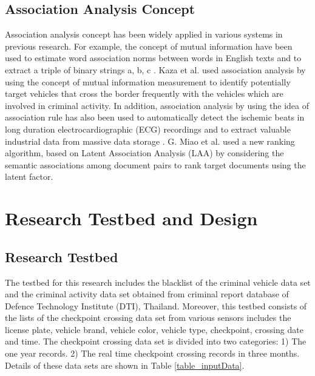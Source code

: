 \documentclass{llncs}
\begin{document}
\subsection{Association Analysis Concept}
Association analysis concept has been widely applied in various systems in previous research.
For example, the concept of mutual information have been used to estimate word association norms between words in English texts \cite{chruch} and to extract a triple of binary strings a, b, c \cite{romashchenko}.
Kaza et al. \cite{kaza} used association analysis by using the concept of mutual information measurement to identify potentially target vehicles that cross the border frequently with the vehicles which are involved in criminal activity.
In addition, association analysis by using the idea of association rule has also been used to automatically detect the ischemic beats in long duration electrocardiographic (ECG) recordings \cite{Exarchos} and to extract valuable industrial data from massive data storage \cite{zhuang}.
G. Miao et al. \cite{miao} used a new ranking algorithm, based on Latent Association Analysis (LAA) by considering
the semantic associations among document pairs to rank target documents using the latent factor.

%
\section{Research Testbed and Design}
%
\subsection{Research Testbed}
The testbed for this research includes the blacklist of the criminal vehicle data set and the criminal activity data set obtained from criminal report database of Defence Technology Institute (DTI), Thailand.
Moreover, this testbed consists of the lists of the checkpoint crossing data set from various sensors includes the license plate, vehicle brand, vehicle color, vehicle type, checkpoint, crossing date and time. The checkpoint crossing data set is divided into two categories: 1) The one year records. 2) The real time checkpoint crossing records in three months. Details of these data sets are shown in Table \ref{table_inputData}.
\end{document}
